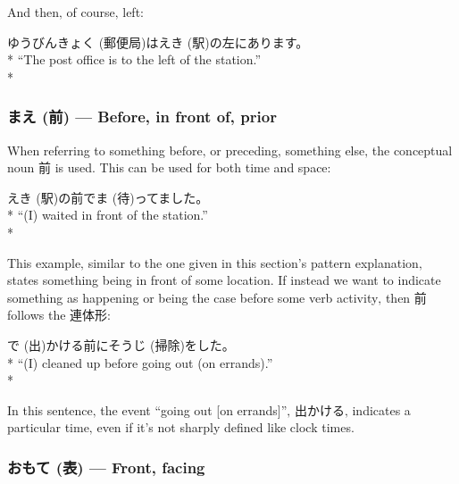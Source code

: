 \documentclass[11pt, b5paper, twoside, openright, onecolumn]{book}
\makeatletter
\newcommand*{\rubystack}[2]{{\relscale{0.5}%
  \begin{tabular}[b]{@{}c@{}}%
    {#1}\\%
   {\textscale{2}{#2}}%
  \end{tabular}}%
}
\DeclareRobustCommand*{\ruby}[2]{%
  \mbox{%
    \setlength{\parskip}{0ex}%
    \BeginAccSupp{method=pdfstringdef,ActualText={#1}}%
      \rubystack{\phantom{#2}}{#1}%
      \llap{%
        \rubystack{#2}{\phantom{#1}}%
      }%
    \EndAccSupp{}%
  }%
}
\renewcommand*{\ruby}[2]{#2 (#1)}%
\newenvironment{exampleblock}{
\setlength{\parindent}{0.6in}
\begin{minipage}[t]{\dimexpr\textwidth-\parindent}}
{\end{minipage}}
\makeatother
\begin{document}
And then‚ of course‚ left:

\vspace{0.4cm}
\begin{exampleblock}
\ruby{郵便局}{ゆうびんきょく}は\ruby{駅}{えき}の左にあります。 \\* 
“The post office is to the left of the station.” \\* 
\end{exampleblock}
\subsubsection{\ruby{前}{まえ} — Before‚ in front of‚ prior}


When referring to something before‚ or preceding‚ something else‚ the conceptual noun 前 is used. This can be used for both time and space:

\vspace{0.4cm}
\begin{exampleblock}
\ruby{駅}{えき}の前で\ruby{待}{ま}ってました。 \\* 
“(I) waited in front of the station.” \\* 
\end{exampleblock}
\vspace{0.2cm}

This example‚ similar to the one given in this section’s pattern explanation‚ states something being in front of some location. If instead we want to indicate something as happening or being the case before some verb activity‚ then 前 follows the 連体形:

\vspace{0.4cm}
\begin{exampleblock}
\ruby{出}{で}かける前に\ruby{掃除}{そうじ}をした。 \\* 
“(I) cleaned up before going out (on errands).” \\* 
\end{exampleblock}
\vspace{0.2cm}

In this sentence‚ the event “going out [on errands]”‚ 出かける‚ indicates a particular time‚ even if it’s not sharply defined like clock times.

\subsubsection{\ruby{表}{おもて} — Front‚ facing}
\end{document}
